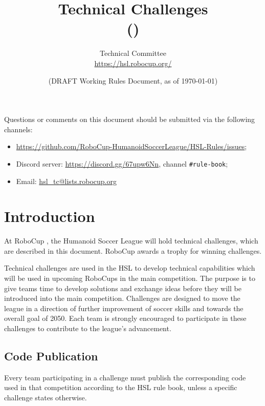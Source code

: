\documentclass[12pt]{article}
\title{Technical Challenges\\\leaguename (\leaguenameabbr)}
\author{\leaguename Technical Committee\\\url{https://hsl.robocup.org/}}
\date{(DRAFT \RCYear Working Rules Document, as of \today)}
\begin{document}

\maketitle
\thispagestyle{empty}

\begin{center}
  Questions or comments on this document should be submitted via the following channels:
  \begin{itemize}
      \item \url{https://github.com/RoboCup-HumanoidSoccerLeague/HSL-Rules/issues};
      \item Discord server: \url{https://discord.gg/67upw6Nn}, channel \texttt{\#rule-book};
      \item Email: \url{hsl_tc@lists.robocup.org}
  \end{itemize}
\end{center}

\newpage
\setcounter{tocdepth}{1}
\tableofcontents

\thispagestyle{fancy}

\clearpage
{}
\setcounter{page}{1}

\newpage


\section{Introduction}
At RoboCup \RCYear, the Humanoid Soccer League will hold technical challenges, which are described in this document.
RoboCup \RCYear awards a trophy for winning challenges.

Technical challenges are used in the HSL to develop technical capabilities which will be used in upcoming RoboCups in the main competition. 
The purpose is to give teams time to develop solutions and exchange ideas before they will be introduced into the main competition. 
Challenges are designed to move the league in a direction of further improvement of soccer skills and towards the overall goal of 2050. 
Each team is strongly encouraged to participate in these challenges to contribute to the league's advancement.

\subsection{Code Publication}
Every team participating in a challenge must publish the corresponding code used in that competition according to the HSL rule book, unless a specific challenge states otherwise.
\end{document}
